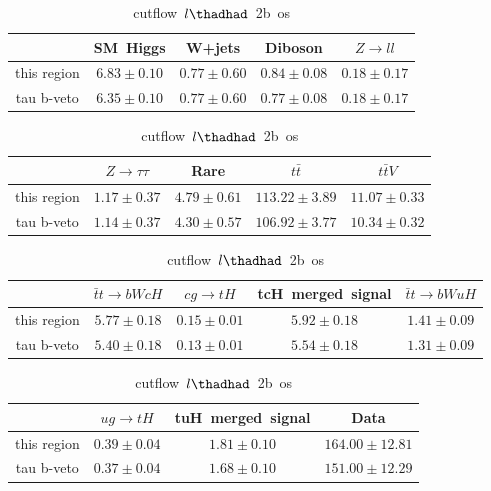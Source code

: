 \begin{table}
\footnotesize
\caption{cutflow~$l\thadhad$~2b~os}
\centering
\begin{tabular}{|c|c|c|c|c|} \hline
 & SM~Higgs & W+jets & Diboson & $Z\to ll$\\\hline
this region & $6.83\pm0.10$ & $0.77\pm0.60$ & $0.84\pm0.08$ & $0.18\pm0.17$\\\hline
tau b-veto & $6.35\pm0.10$ & $0.77\pm0.60$ & $0.77\pm0.08$ & $0.18\pm0.17$\\\hline
\end{tabular}
\begin{tabular}{|c|c|c|c|c|} \hline
 & $Z\to \tau\tau$ & Rare & $t\bar{t}$ & $t\bar{t}V$\\\hline
this region & $1.17\pm0.37$ & $4.79\pm0.61$ & $113.22\pm3.89$ & $11.07\pm0.33$\\\hline
tau b-veto & $1.14\pm0.37$ & $4.30\pm0.57$ & $106.92\pm3.77$ & $10.34\pm0.32$\\\hline
\end{tabular}
\begin{tabular}{|c|c|c|c|c|} \hline
 & $\bar{t}t\to bWcH$ & $cg\to tH$ & tcH~merged~signal & $\bar{t}t\to bWuH$\\\hline
this region & $5.77\pm0.18$ & $0.15\pm0.01$ & $5.92\pm0.18$ & $1.41\pm0.09$\\\hline
tau b-veto & $5.40\pm0.18$ & $0.13\pm0.01$ & $5.54\pm0.18$ & $1.31\pm0.09$\\\hline
\end{tabular}
\begin{tabular}{|c|c|c|c|} \hline
 & $ug\to tH$ & tuH~merged~signal & Data\\\hline
this region & $0.39\pm0.04$ & $1.81\pm0.10$ & $164.00\pm12.81$\\\hline
tau b-veto & $0.37\pm0.04$ & $1.68\pm0.10$ & $151.00\pm12.29$\\\hline
\end{tabular}
\label{tab:cutflow_reg1l2tau2bnj_os}
\end{table}
